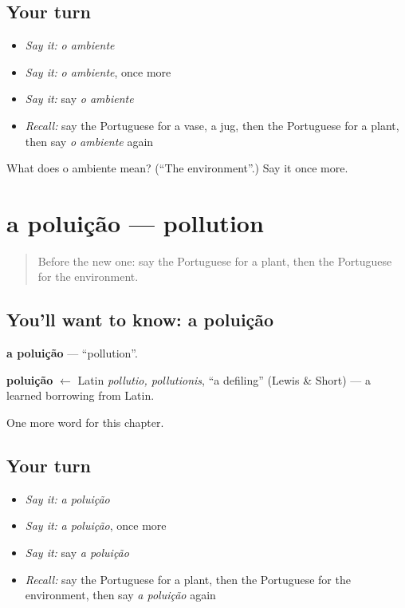 \subsection*{Your turn}
\begin{itemize}
\raggedright
  \item \emph{Say it:} \emph{o ambiente}
  \item \emph{Say it:} \emph{o ambiente}, once more
  \item \emph{Say it:} say \emph{o ambiente}
  \item \emph{Recall:} say the Portuguese for a vase, a jug, then the Portuguese for a plant, then say \emph{o ambiente} again
\end{itemize}

\begin{tcolorbox}[breakable,colback=teal!4,colframe=teal!35!black,title={Before you move on}]
What does o ambiente mean? (\textquotedblleft{}The environment\textquotedblright{}.) Say it once more.
\end{tcolorbox}
\section[a poluição]{a poluição — pollution}

\label{lesson:PT-C225-poluicao}



\begin{quote}
Before the new one: say the Portuguese for a plant, then the Portuguese for the environment.
\end{quote}

\subsection*{You'll want to know: a poluição}
\textbf{a poluição} — \textquotedblleft{}pollution\textquotedblright{}.

\begin{cousinweb}
\textbf{poluição} $\leftarrow$ Latin \emph{pollutio, pollutionis}, \textquotedblleft{}a defiling\textquotedblright{} (Lewis \& Short) — a learned borrowing from Latin.
\end{cousinweb}

\begin{grammarlens}[title={What you've built}]
One more word for this chapter.
\end{grammarlens}

\subsection*{Your turn}
\begin{itemize}
\raggedright
  \item \emph{Say it:} \emph{a poluição}
  \item \emph{Say it:} \emph{a poluição}, once more
  \item \emph{Say it:} say \emph{a poluição}
  \item \emph{Recall:} say the Portuguese for a plant, then the Portuguese for the environment, then say \emph{a poluição} again
\end{itemize}

